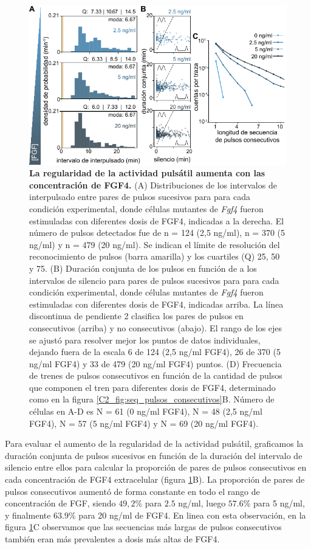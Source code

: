 \documentclass[./main.tex]{subfiles}
\begin{document}
\begin{figure}
    \centering
    \includegraphics[width=1\columnwidth]{figures/chapter3/C3_FGF_consecutive.pdf} \caption{\textbf{La regularidad de la actividad pulsátil aumenta con las concentración de FGF4.} (A) Distribuciones de los intervalos de interpulsado entre pares de pulsos sucesivos para para cada condición experimental, donde células mutantes de \textit{Fgf4} fueron estimuladas con diferentes dosis de FGF4, indicadas a la derecha. El número de pulsos detectados fue de n = 124 (2,5 ng/ml), n = 370 (5 ng/ml) y n = 479 (20 ng/ml). Se indican el límite de resolución del reconocimiento de pulsos (barra amarilla) y los cuartiles (Q) 25, 50 y 75. (B) Duración conjunta de los pulsos en función de a los intervalos de silencio para pares de pulsos sucesivos para para cada condición experimental, donde células mutantes de \textit{Fgf4} fueron estimuladas con diferentes dosis de FGF4, indicadas arriba. La línea discontinua de pendiente 2 clasifica los pares de pulsos en consecutivos (arriba) y no consecutivos (abajo). El rango de los ejes se ajustó para resolver mejor los puntos de datos individuales, dejando fuera de la escala 6 de 124 (2,5 ng/ml FGF4), 26 de 370 (5 ng/ml FGF4) y 33 de 479 (20 ng/ml FGF4) puntos. (D) Frecuencia de trenes de pulsos consecutivos en función de la cantidad de pulsos que componen el tren para diferentes dosis de FGF4, determinado como en la figura \ref{C2_fig:seq_pulsos_consecutivos}B. Número de células en A-D es N = 61 (0 ng/ml FGF4), N = 48 (2,5 ng/ml FGF4), N = 57 (5 ng/ml FGF4) y N = 69 (20 ng/ml FGF4).}
    \label{C3_fig:FGF_consecutive}
\end{figure}
 

Para evaluar el aumento de la regularidad de la actividad pulsátil, graficamos la duración conjunta de pulsos sucesivos en función de la duración del intervalo de silencio entre ellos para calcular la proporción de pares de pulsos consecutivos en cada concentración de FGF4 extracelular (figura \ref{C3_fig:FGF_consecutive}B). La proporción de pares de pulsos consecutivos aumentó de forma constante en todo el rango de concentración de FGF, siendo $49,2 \% $ para $2.5$ ng/ml, luego $57.6\%$ para 5 ng/ml, y finalmente $63.9\%$ para 20 ng/ml de FGF4. En linea con esta observación, en la figura \ref{C3_fig:FGF_consecutive}C observamos que las secuencias más largas de pulsos consecutivos también eran más prevalentes a dosis más altas de FGF4.
\end{document}
